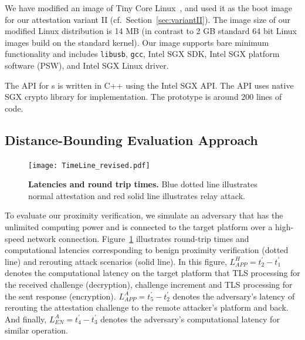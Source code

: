
\ifusenix
\vspace{-12pt}
\else
\fi
{} We have modified an image of Tiny Core Linux~\cite{tinyCore}, and used it as the boot image for our attestation variant II (cf.\ Section~\ref{sec:variantII}). The image size of our modified Linux distribution is 14 MB (in contrast to 2 GB standard 64 bit Linux images build on the standard kernel). Our image supports bare minimum functionality and includes \texttt{libusb}, \texttt{gcc}, Intel SGX SDK, Intel SGX platform software (PSW), and Intel SGX Linux driver.

\ifusenix
\vspace{-12pt}
\else
\fi
{} The \name API for \app{}s is written in C++ using the Intel SGX API. The API uses native SGX crypto library for \tls implementation. The prototype is around 200 lines of code.


\iffalse
\subsection{Distance-Bounding Evaluation Approach}

\begin{figure}[t]
 \centering
  \texttt{[image: TimeLine\_revised.pdf]}
 \caption{\textbf{Latencies and round trip times.} Blue dotted line illustrates normal attestation and red solid line illustrates relay attack.}
 \vspace{-2.3em}
 \label{fig:latency}
\end{figure}

To evaluate our proximity verification, we simulate an adversary that has the unlimited computing power and is connected to the target platform over a high-speed network connection.
Figure~\ref{fig:latency} illustrates round-trip times and computational latencies corresponding to benign proximity verification (dotted line) and rerouting attack scenarios (solid line). In this figure, $L_{APP}^H=t_{2}^\prime-t_{1}^\prime$ denotes the computational latency on the target platform that TLS processing for the received challenge (decryption), challenge increment and TLS processing for the sent response (encryption). $L_{APP}^A=t_{5}^\prime-t_{2}^\prime$ denotes the adversary's latency of rerouting the attestation challenge to the remote attacker's platform and back. And finally, $L_{EN}^A=t_{4}^\prime-t_{3}^\prime$ denotes the adversary's computational latency for similar operation.

